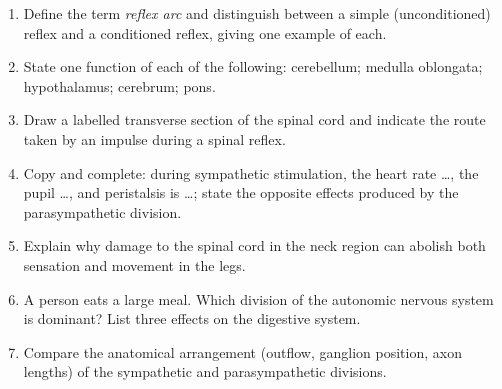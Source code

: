 \documentclass[11pt]{article}
\begin{document}
\begin{exercice}
\begin{enumerate}
\item Define the term \emph{reflex arc} and distinguish between a simple (unconditioned) reflex and a conditioned reflex, giving one example of each.
\item State one function of each of the following: cerebellum; medulla oblongata; hypothalamus; cerebrum; pons.
\item Draw a labelled transverse section of the spinal cord and indicate the route taken by an impulse during a spinal reflex.
\item Copy and complete: during sympathetic stimulation, the heart rate \ldots, the pupil \ldots, and peristalsis is \ldots; state the opposite effects produced by the parasympathetic division.
\item Explain why damage to the spinal cord in the neck region can abolish both sensation and movement in the legs.
\item A person eats a large meal. Which division of the autonomic nervous system is dominant? List three effects on the digestive system.
\item Compare the anatomical arrangement (outflow, ganglion position, axon lengths) of the sympathetic and parasympathetic divisions.
\end{enumerate}
\end{exercice}
\end{document}

